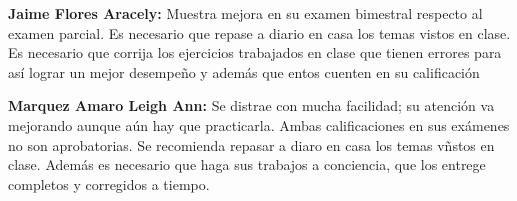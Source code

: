 \documentclass{article}
\begin{document}
\textbf{Jaime Flores Aracely:} Muestra mejora en su examen bimestral respecto al examen parcial. Es necesario que repase a diario en casa los temas vistos en clase. Es necesario que corrija los ejercicios trabajados en clase que tienen errores para as\'i lograr un mejor desempe\~no y adem\'as que entos cuenten en su calificaci\'on

\textbf{Marquez Amaro Leigh Ann:} Se distrae con mucha facilidad; su atenci\'on va mejorando aunque a\'un hay que practicarla. Ambas calificaciones en sus ex\'amenes no son aprobatorias. Se recomienda repasar a diaro en casa los temas v\~nstos en clase. Adem\'as es necesario que haga sus trabajos a conciencia, que los entrege completos y corregidos a tiempo.
\end{document}

